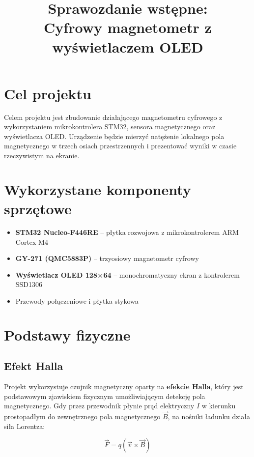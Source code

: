 \documentclass[12pt,a4paper]{article}
\title{Sprawozdanie wstępne:\\Cyfrowy magnetometr z wyświetlaczem OLED}
\author{}
\date{}
\begin{document}
\maketitle

\section{Cel projektu}

Celem projektu jest zbudowanie działającego magnetometru cyfrowego z wykorzystaniem mikrokontrolera STM32, sensora magnetycznego oraz wyświetlacza OLED. Urządzenie będzie mierzyć natężenie lokalnego pola magnetycznego w trzech osiach przestrzennych i prezentować wyniki w czasie rzeczywistym na ekranie.

\section{Wykorzystane komponenty sprzętowe}

\begin{itemize}
    \item \textbf{STM32 Nucleo-F446RE} -- płytka rozwojowa z mikrokontrolerem ARM Cortex-M4
    \item \textbf{GY-271 (QMC5883P)} -- trzyosiowy magnetometr cyfrowy
    \item \textbf{Wyświetlacz OLED 128×64} -- monochromatyczny ekran z kontrolerem SSD1306
    \item Przewody połączeniowe i płytka stykowa
\end{itemize}

\section{Podstawy fizyczne}

\subsection{Efekt Halla}

Projekt wykorzystuje czujnik magnetyczny oparty na \textbf{efekcie Halla}, który jest podstawowym zjawiskiem fizycznym umożliwiającym detekcję pola magnetycznego. Gdy przez przewodnik płynie prąd elektryczny $I$ w kierunku prostopadłym do zewnętrznego pola magnetycznego $\vec{B}$, na nośniki ładunku działa siła Lorentza:

\begin{equation}
\vec{F} = q(\vec{v} \times \vec{B})
\end{equation}
\end{document}
